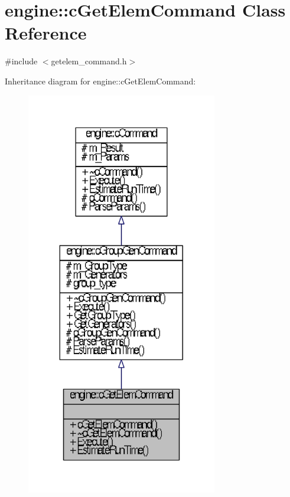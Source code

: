 \hypertarget{classengine_1_1cGetElemCommand}{\section{engine\-:\-:c\-Get\-Elem\-Command \-Class \-Reference}
\label{classengine_1_1cGetElemCommand}
}


{\ttfamily \#include $<$getelem\-\_\-command.\-h$>$}



\-Inheritance diagram for engine\-:\-:c\-Get\-Elem\-Command\-:\nopagebreak
\begin{figure}[H]
\begin{center}
\leavevmode
\includegraphics[width=236pt]{classengine_1_1cGetElemCommand__inherit__graph}
\end{center}
\end{figure}


